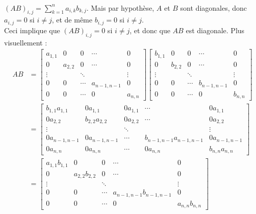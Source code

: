 \begin{exercice}
\, \\
\noindent $(AB)_{i,j}=\displaystyle\sum_{k=1}^{n}a_{i,k}b_{k,j}$. Mais par hypothèse, $A$ et $B$ sont diagonales, donc $a_{i,j} = 0$ si $i \neq j$, et de même $b_{i,j} = 0$ si $i \neq j$. \\
Ceci implique que $(AB)_{i,j} = 0$ si $i \neq j$, et donc que $AB$ est diagonale. Plus visuellement : 
\begin{align*}
AB &= \begin{bmatrix}
a_{1,1} & 0 & 0 & \cdots & 0\\
0 & a_{2,2} & 0 & \cdots & 0 \\
\vdots & &\ddots & & \vdots \\
0 & 0 & \cdots & a_{n-1, n-1} & 0\\
0 & 0 &\cdots& 0 & a_{n,n}
\end{bmatrix}
\begin{bmatrix}
b_{1,1} & 0 & 0 & \cdots & 0\\
0 & b_{2,2} & 0 & \cdots & 0 \\
\vdots & &\ddots & & \vdots \\
0 & 0 & \cdots & b_{n-1, n-1} & 0\\
0 & 0 &\cdots& 0 & b_{n,n}
\end{bmatrix}\\
&= \begin{bmatrix}
b_{1,1}a_{1,1} & 0a_{1,1} & 0a_{1,1} & \cdots & 0a_{1,1}\\
0a_{2,2} & b_{2,2}a_{2,2} & 0a_{2,2} & \cdots & 0a_{2,2} \\
\vdots & &\ddots & & \vdots \\
0a_{n-1, n-1} & 0a_{n-1, n-1} & \cdots & b_{n-1, n-1}a_{n-1, n-1} & 0a_{n-1, n-1}\\
0a_{n,n} & 0a_{n,n} &\cdots& 0a_{n,n} & b_{n,n}a_{n,n}
\end{bmatrix}\\
&= \begin{bmatrix}
a_{1,1}b_{1,1} & 0 & 0 & \cdots & 0\\
0 & a_{2,2}b_{2,2} & 0 & \cdots & 0 \\
\vdots & &\ddots & & \vdots \\
0 & 0 & \cdots & a_{n-1,n-1}b_{n-1, n-1} & 0\\
0 & 0 &\cdots& 0 & a_{n,n}b_{n,n}
\end{bmatrix}
\end{align*}
\, \\
\end{exercice}

